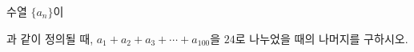 수열 $\{a_n\}$이\par\smallskip{}\par\smallskip\noindent 과 같이 정의될 때, $a_1+a_2+a_3+\cdots+a_{100}$을 $24$로 나누었을 때의 나머지를 구하시오.
